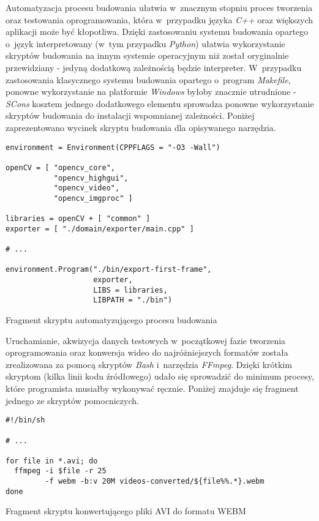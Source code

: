       Automatyzacja procesu budowania ułatwia w~znacznym stopniu proces tworzenia oraz testowania oprogramowania, która w~przypadku języka \textit{C++} oraz większych aplikacji może być kłopotliwa. Dzięki zastosowaniu systemu budowania opartego o~język interpretowany (w~tym przypadku \textit{Python}) ułatwia wykorzystanie skryptów budowania na innym systemie operacyjnym niż został oryginalnie przewidziany - jedyną dodatkową zależnością będzie interpreter. W~przypadku zastosowania klasycznego systemu budowania opartego o~program \textit{Makefile}, ponowne wykorzystanie na platformie \textit{Windows} byłoby znacznie utrudnione - \textit{SCons} kosztem jednego dodatkowego elementu sprowadza ponowne wykorzystanie skryptów budowania do instalacji wspomnianej zależności. Poniżej zaprezentowano wycinek skryptu budowania dla opisywanego narzędzia.

      \begin{sample}[ht]
        \begin{verbatim}
environment = Environment(CPPFLAGS = "-O3 -Wall")

openCV = [ "opencv_core",
           "opencv_highgui",
           "opencv_video",
           "opencv_imgproc" ]

libraries = openCV + [ "common" ]
exporter = [ "./domain/exporter/main.cpp" ]

# ...

environment.Program("./bin/export-first-frame",
                    exporter,
                    LIBS = libraries,
                    LIBPATH = "./bin")
        \end{verbatim}
        \caption{Fragment skryptu automatyzującego procesu budowania}
        \label{BuildingProcessScript}
      \end{sample}

      Uruchamianie, akwizycja danych testowych w~początkowej fazie tworzenia oprogramowania oraz konwersja wideo do najróżniejszych formatów została zrealizowana za pomocą skryptów \textit{Bash} i~narzędzia \textit{FFmpeg}. Dzięki krótkim skryptom (kilka linii kodu źródłowego) udało się sprowadzić do minimum procesy, które programista musiałby wykonywać ręcznie. Poniżej znajduje się fragment jednego ze skryptów pomocniczych.

      \newpage
      \begin{sample}[ht]
        \begin{verbatim}
#!/bin/sh

# ...

for file in *.avi; do
  ffmpeg -i $file -r 25
         -f webm -b:v 20M videos-converted/${file%%.*}.webm
done
        \end{verbatim}
        \caption{Fragment skryptu konwertującego pliki AVI do formatu WEBM}
        \label{UtilityScript}
      \end{sample}

